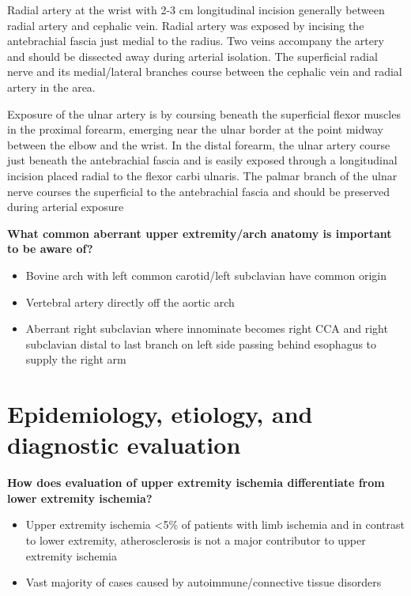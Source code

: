 \documentclass[
]{book}
\begin{document}
Radial artery at the wrist with 2-3 cm longitudinal incision generally
between radial artery and cephalic vein. Radial artery was exposed by
incising the antebrachial fascia just medial to the radius. Two veins
accompany the artery and should be dissected away during arterial
isolation. The superficial radial nerve and its medial/lateral branches
course between the cephalic vein and radial artery in the area.

Exposure of the ulnar artery is by coursing beneath the superficial
flexor muscles in the proximal forearm, emerging near the ulnar border
at the point midway between the elbow and the wrist. In the distal
forearm, the ulnar artery course just beneath the antebrachial fascia
and is easily exposed through a longitudinal incision placed radial to
the flexor carbi ulnaris. The palmar branch of the ulnar nerve courses
the superficial to the antebrachial fascia and should be preserved
during arterial exposure

\textbf{What common aberrant upper extremity/arch anatomy is important to be
aware of?}

\begin{itemize}
\item
  Bovine arch with left common carotid/left subclavian have common
  origin
\item
  Vertebral artery directly off the aortic arch
\item
  Aberrant right subclavian where innominate becomes right CCA and
  right subclavian distal to last branch on left side passing behind
  esophagus to supply the right arm
\end{itemize}

\hypertarget{epidemiology-etiology-and-diagnostic-evaluation}{%
\section{Epidemiology, etiology, and diagnostic evaluation}\label{epidemiology-etiology-and-diagnostic-evaluation}}

\textbf{How does evaluation of upper extremity ischemia differentiate from
lower extremity ischemia?} \citet{shuja117UpperExtremity}

\begin{itemize}
\item
  Upper extremity ischemia \textless5\% of patients with limb ischemia and in
  contrast to lower extremity, atherosclerosis is not a major
  contributor to upper extremity ischemia
\item
  Vast majority of cases caused by autoimmune/connective tissue
  disorders
\end{itemize}
\end{document}
